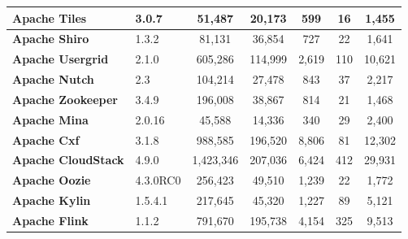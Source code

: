 \begin{landscape}
\begin{table}[htbp]
\begin{adjustbox}{width=1.3\textwidth}
\begin{tabular}{l|l|c|c|c|c|c}
				\textbf{Apache Tiles}      & 3.0.7            & 51,487                     &           20,173           &        599        &           16           &        1,455         \\ \hline
				\textbf{Apache Shiro}      & ‎1.3.2           & 81,131                     &           36,854           &        727        &           22           &        1,641         \\ \hline
				\textbf{Apache Usergrid}   & 2.1.0            & 605,286                    &          114,999           &       2,619        &          110           &        10,621        \\ \hline
				\textbf{Apache Nutch}      & 2.3              & 104,214                    &           27,478           &        843        &           37           &        2,217         \\ \hline
				\textbf{Apache Zookeeper}  & 3.4.9            & 196,008                    &           38,867           &        814        &           21           &        1,468         \\ \hline
				\textbf{Apache Mina}       & 2.0.16           & 45,588                     &           14,336           &        340        &           29           &        2,400         \\ \hline
				\textbf{Apache Cxf}        & 3.1.8            & 988,585                    &          196,520           &       8,806        &           81           &        12,302        \\ \hline
				\textbf{Apache CloudStack} & 4.9.0            & 1,423,346                   &          207,036           &       6,424        &          412           &        29,931        \\ \hline
				\textbf{Apache Oozie}      & 4.3.0RC0         & 256,423                    &           49,510           &       1,239        &           22           &        1,772         \\ \hline
				\textbf{Apache Kylin}      & 1.5.4.1          & 217,645                    &           45,320           &       1,227        &           89           &        5,121         \\ \hline
				\textbf{Apache Flink}      & 1.1.2            & 791,670                    &          195,738           &       4,154        &          325           &        9,513         \\ \hline
			\end{tabular}
			\label{table:ch4_projects_statistics_2}
			
		\end{adjustbox}
		
	\end{table}
	
\end{landscape}



